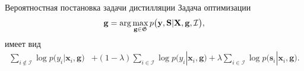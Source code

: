 \documentclass[10pt,pdf,hyperref={unicode}]{beamer}
\begin{document}
\begin{frame}{Вероятностная постановка задачи дистилляции}
Задача оптимизации
\[
\setlength\abovedisplayskip{0pt}
\mathbf{g} = \arg\max_{\mathbf{g} \in \mathfrak{G}} p\bigr(\mathbf{y},  \mathbf{S}|\mathbf{X}, \mathbf{g}, \mathcal{I}\bigr),
\setlength\belowdisplayskip{0pt}
\]
имеет вид
\[
\begin{aligned}
\sum_{i\not\in \mathcal{I}}\log p\bigr(y_i|\mathbf{x}_i, \mathbf{g}\bigr) &+ \left(1-\lambda\right)\sum_{i\in \mathcal{I}}\log p\bigr(y_i|\mathbf{x}_i, \mathbf{g}\bigr) + \lambda\sum_{i\in \mathcal{I}}\log p\bigr(\mathbf{s}_i|\mathbf{x}_i, \mathbf{g}\bigr).
\end{aligned}
\]
\end{frame}

\end{document}
